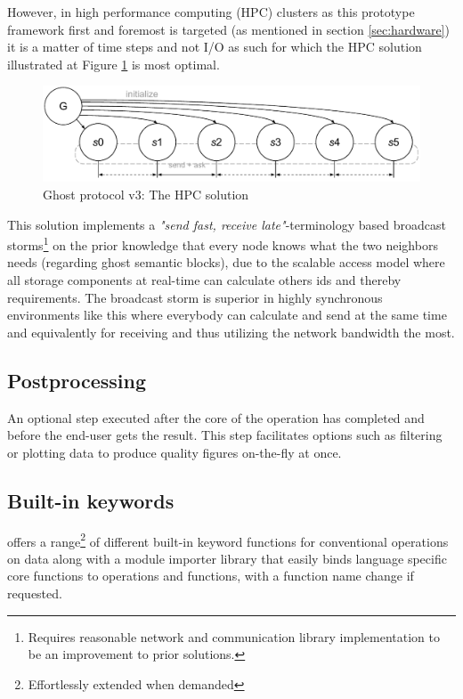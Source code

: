 However, in high performance computing (HPC) clusters as this prototype framework first and foremost is targeted (as mentioned in section \ref{sec:hardware}) it is a matter of time steps and not I/O as such for which the HPC solution illustrated at Figure \ref{fig:ghost-final} is most optimal.
\newline

\begin{figure}
	\centering
	\includegraphics[scale=0.68]{pdf/ghost-final.pdf}
	\caption{Ghost protocol v3: The HPC solution \label{fig:ghost-final}}
\end{figure}	

This solution implements a \textit{"send fast, receive late"}-terminology based broadcast storms\footnote{Requires reasonable network and communication library implementation to be an improvement to prior solutions.} on the prior knowledge that every node knows what the two neighbors needs (regarding ghost semantic blocks), due to the scalable access model where all storage components at real-time can calculate others ids and thereby requirements. The broadcast storm is superior in highly synchronous environments like this where everybody can calculate and send at the same time and equivalently for receiving and thus utilizing the network bandwidth the most. 

\subsection{Postprocessing}
An optional step executed after the core of the operation has completed and before the end-user gets the result. This step facilitates options such as filtering or plotting data to produce quality figures on-the-fly at once.

\subsection{Built-in keywords}
\CodeName offers a range\footnote{Effortlessly extended when demanded} of different built-in keyword functions for conventional operations on data along with a module importer library that easily binds language specific core functions to \CodeName operations and functions, with a function name change if requested.

